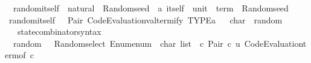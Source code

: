 \begin{isabellebody}
\isanewline
\isanewline
{}\isamarkupfalse%
\isanewline
\ \ random{\isacharunderscore}{\kern0pt}itself\ {\isacharcolon}{\kern0pt}{\isacharcolon}{\kern0pt}\ {\isachardoublequoteopen}natural\ {\isasymRightarrow}\ Random{\isachardot}{\kern0pt}seed\ {\isasymRightarrow}\ {\isacharparenleft}{\kern0pt}{\isacharprime}{\kern0pt}a\ itself\ {\isasymtimes}\ {\isacharparenleft}{\kern0pt}unit\ {\isasymRightarrow}\ term{\isacharparenright}{\kern0pt}{\isacharparenright}{\kern0pt}\ {\isasymtimes}\ Random{\isachardot}{\kern0pt}seed{\isachardoublequoteclose}\isanewline
{}\ {\isachardoublequoteopen}random{\isacharunderscore}{\kern0pt}itself\ {\isacharunderscore}{\kern0pt}\ {\isacharequal}{\kern0pt}\ Pair\ {\isacharparenleft}{\kern0pt}Code{\isacharunderscore}{\kern0pt}Evaluation{\isachardot}{\kern0pt}valtermify\ TYPE{\isacharparenleft}{\kern0pt}{\isacharprime}{\kern0pt}a{\isacharparenright}{\kern0pt}{\isacharparenright}{\kern0pt}{\isachardoublequoteclose}\isanewline
\isanewline
{}\isamarkupfalse%
%
\isadelimproof
\ %
\endisadelimproof
%
\isatagproof
\isacommand{{\isachardot}{\kern0pt}{\isachardot}{\kern0pt}}\isamarkupfalse%
%
\endisatagproof
{\isafoldproof}%
%
\isadelimproof
%
\endisadelimproof
\isanewline
\isanewline
{}\isamarkupfalse%
\isanewline
\isanewline
{}\isamarkupfalse%
\ char\ {\isacharcolon}{\kern0pt}{\isacharcolon}{\kern0pt}\ random\isanewline
{}\isanewline
\isanewline
{}\isamarkupfalse%
\isanewline
\ \ \ state{\isacharunderscore}{\kern0pt}combinator{\isacharunderscore}{\kern0pt}syntax\isanewline
{}\isanewline
\isanewline
{}\isamarkupfalse%
\isanewline
\ \ {\isachardoublequoteopen}random\ {\isacharunderscore}{\kern0pt}\ {\isacharequal}{\kern0pt}\ Random{\isachardot}{\kern0pt}select\ {\isacharparenleft}{\kern0pt}Enum{\isachardot}{\kern0pt}enum\ {\isacharcolon}{\kern0pt}{\isacharcolon}{\kern0pt}\ char\ list{\isacharparenright}{\kern0pt}\ {\isasymcirc}{\isasymrightarrow}\ {\isacharparenleft}{\kern0pt}{\isasymlambda}c{\isachardot}{\kern0pt}\ Pair\ {\isacharparenleft}{\kern0pt}c{\isacharcomma}{\kern0pt}\ {\isasymlambda}u{\isachardot}{\kern0pt}\ Code{\isacharunderscore}{\kern0pt}Evaluation{\isachardot}{\kern0pt}term{\isacharunderscore}{\kern0pt}of\ c{\isacharparenright}{\kern0pt}{\isacharparenright}{\kern0pt}{\isachardoublequoteclose}\isanewline
\isanewline
{}\isamarkupfalse%
%
\isadelimproof
\ %
\endisadelimproof
%
\isatagproof
\isacommand{{\isachardot}{\kern0pt}{\isachardot}{\kern0pt}}\isamarkupfalse%

\end{isabellebody}
